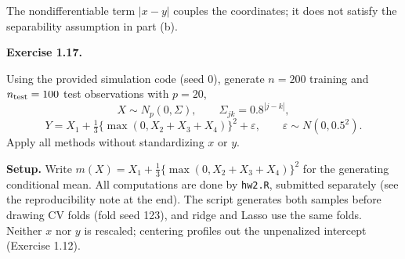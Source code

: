 \documentclass[answers,12pt,addpoints]{exam}
\begin{document}
\begin{questions}
\begin{solution}
The nondifferentiable term $|x-y|$ couples the coordinates;
it does not satisfy the separability assumption in part (b).

\end{solution}

\question \textbf{Exercise 1.17.}

Using the provided simulation code (seed 0), generate $n=200$
training and $n_{\rm test}=100$ test observations with $p=20$,
\[
X\sim N_p(0,\Sigma),\qquad \Sigma_{jk}=0.8^{|j-k|},
\]
\[
Y=X_1+\tfrac13\{\max(0,X_2+X_3+X_4)\}^2+\varepsilon,\qquad
\varepsilon\sim N(0,0.5^2).
\]
Apply all methods without standardizing $x$ or $y$.


\begin{solution}

\textbf{Setup.}
Write $m(X)=X_1+\frac13\{\max(0,X_2+X_3+X_4)\}^2$ for the
generating conditional mean.
All computations are done by \texttt{hw2.R}, submitted separately
(see the reproducibility note at the end). The script generates both
samples before drawing CV folds (fold seed 123), and ridge and Lasso
use the same folds. Neither $x$ nor $y$ is rescaled; centering
profiles out the unpenalized intercept (Exercise 1.12).


\end{solution}
\end{questions}
\end{document}
